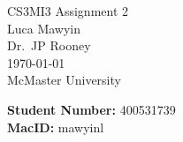 \documentclass[letterpaper]{article}
\theoremstyle{plain}
\theoremstyle{definition}
\theoremstyle{remark}
\begin{document}

\begin{titlepage}
    \centering
    \vspace*{3cm}
    
    {\Huge CS3MI3 Assignment 2}\\[2cm]
    
    {\large Luca Mawyin}\\[0.5cm]
    
    {\large Dr.\ JP Rooney}\\[0.5cm]

    {\large \today}\\[2cm]

    {\Large McMaster University}

    \vfill
    \begin{flushleft}

        {\large \textbf{Student Number: }400531739}\\[0.5cm]
        {\large \textbf{MacID:} mawyinl}
    \end{flushleft}

\end{titlepage}

\renewcommand{\thesection}{Question \arabic{section}}

\section{}
\end{document}
